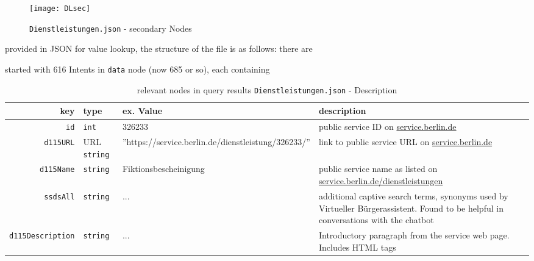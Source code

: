 \begin{figure}[h]
	\caption{\texttt{Dienstleistungen.json} - secondary Nodes}
	\texttt{[image: DLsec]}
\end{figure}



provided in JSON for value lookup, the structure of the file is as follows: there are 


started with 616 Intents in \lstinline|data| node (now 685 or so), each containing \inote{}

\begin{table}[htbp]
	\caption{relevant nodes in query results \texttt{Dienstleistungen.json} - Description}
	\label{dienstleistung:descr}
	\begin{tabu} to \linewidth {  r | l | l | l }
		key & type & ex. Value & description\\ \hline
		
		\texttt{id} & \texttt{int} & 326233 & public service ID on \href{https://service.berlin.de}{service.berlin.de} \\
		
		\texttt{d115URL} & URL \texttt{string} & ''https://service.berlin.de/dienstleistung/326233/'' & link to public service URL on  \href{https://service.berlin.de}{service.berlin.de} \\
		
		\texttt{d115Name} & \texttt{string} & Fiktionsbescheinigung & public service name as listed on \href{https://service.berlin.de}{service.berlin.de/dienstleistungen} \\		
		
		\texttt{ssdsAll} & \texttt{string} & ... & additional captive search terms, synonyms used by Virtueller Bürgerassistent. Found to be helpful in conversations with the chatbot \\		
		
		\texttt{d115Description} & \texttt{string} & ... & Introductory paragraph from the service web page. 
		Includes HTML tags \\ %
		

\end{tabu}
\end{table}

